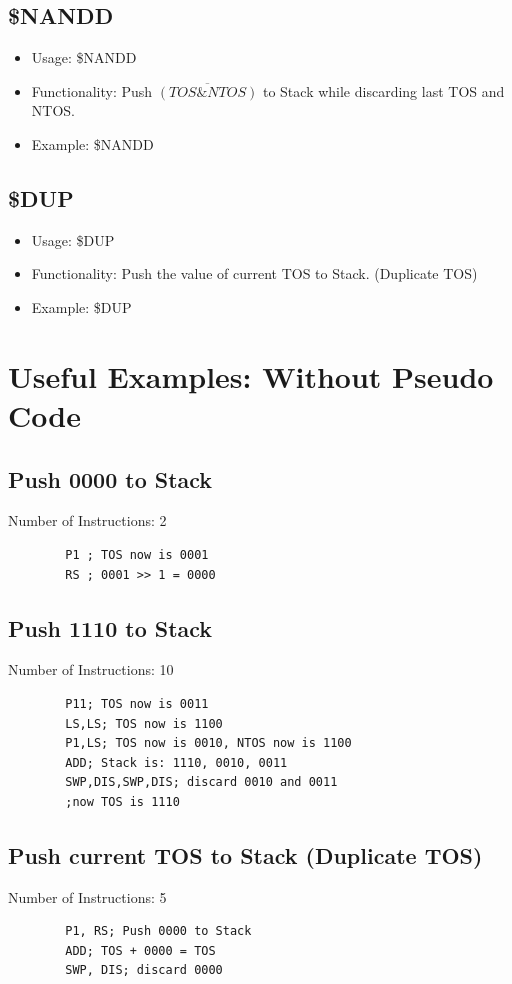 \documentclass[11pt]{report}
\begin{document}
    \subsection{\$NANDD}
    \begin{itemize}
        \item Usage: \$NANDD
        \item Functionality: Push $\overline{(TOS \& NTOS)}$ to Stack while discarding last TOS and NTOS.
        \item Example: \$NANDD
    \end{itemize}
    \subsection{\$DUP}
    \begin{itemize}
        \item Usage: \$DUP
        \item Functionality: Push the value of current TOS to Stack. (Duplicate TOS)
        \item Example: \$DUP
    \end{itemize}

    \section{Useful Examples: Without Pseudo Code}
    \subsection{Push 0000 to Stack}
    Number of Instructions: 2
    \begin{verbatim}
        P1 ; TOS now is 0001
        RS ; 0001 >> 1 = 0000
    \end{verbatim}

    \subsection{Push 1110 to Stack}
    Number of Instructions: 10
    \begin{verbatim}
        P11; TOS now is 0011
        LS,LS; TOS now is 1100
        P1,LS; TOS now is 0010, NTOS now is 1100
        ADD; Stack is: 1110, 0010, 0011
        SWP,DIS,SWP,DIS; discard 0010 and 0011
        ;now TOS is 1110
    \end{verbatim}

    \subsection{Push current TOS to Stack (Duplicate TOS)}
    Number of Instructions: 5
    \begin{verbatim}
        P1, RS; Push 0000 to Stack
        ADD; TOS + 0000 = TOS
        SWP, DIS; discard 0000
    \end{verbatim}
\end{document}
